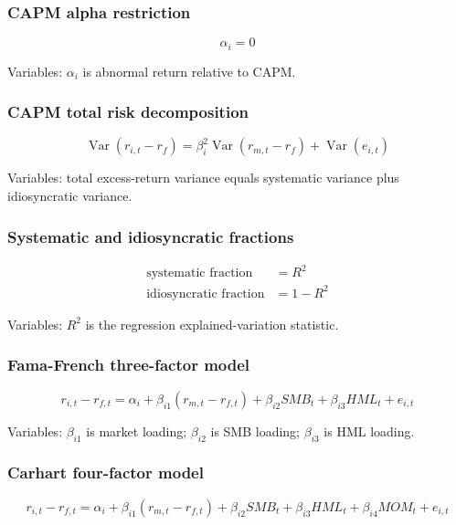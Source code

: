 \documentclass[
  8pt,
  twocolumn]{extarticle}
\begin{document}
\subsubsection{CAPM alpha restriction}\label{capm-alpha-restriction}

\[
\alpha_i=0
\]

Variables: \(\alpha_i\) is abnormal return relative to CAPM.

\subsubsection{CAPM total risk
decomposition}\label{capm-total-risk-decomposition}

\[
\operatorname{Var}(r_{i,t}-r_f)=\beta_i^2\operatorname{Var}(r_{m,t}-r_f)+\operatorname{Var}(e_{i,t})
\]

Variables: total excess-return variance equals systematic variance plus
idiosyncratic variance.

\subsubsection{Systematic and idiosyncratic
fractions}\label{systematic-and-idiosyncratic-fractions}

\[
\begin{aligned}
\text{systematic fraction}&=R^2\\
\text{idiosyncratic fraction}&=1-R^2
\end{aligned}
\]

Variables: \(R^2\) is the regression explained-variation statistic.

\subsubsection{Fama-French three-factor
model}\label{fama-french-three-factor-model}

\[
r_{i,t}-r_{f,t}=\alpha_i+\beta_{i1}(r_{m,t}-r_{f,t})+\beta_{i2}SMB_t+\beta_{i3}HML_t+e_{i,t}
\]

Variables: \(\beta_{i1}\) is market loading; \(\beta_{i2}\) is SMB
loading; \(\beta_{i3}\) is HML loading.

\subsubsection{Carhart four-factor
model}\label{carhart-four-factor-model}

\[
r_{i,t}-r_{f,t}=\alpha_i+\beta_{i1}(r_{m,t}-r_{f,t})+\beta_{i2}SMB_t+\beta_{i3}HML_t+\beta_{i4}MOM_t+e_{i,t}
\]
\end{document}
